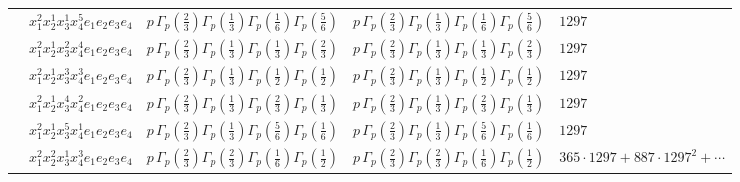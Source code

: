 \documentclass[11pt]{article}
\begin{document}
\begin{table}[ht]
{\begin{tabular}{@{}lllll@{}}
 & $x_{1}^{2} x_{2}^{1} x_{3}^{1} x_{4}^{5}  e_{1} e_{2} e_{3} e_{4}$ & $p \, \Gamma_p \left( \frac{2}{3} \right) \Gamma_p \left( \frac{1}{3} \right) \Gamma_p \left( \frac{1}{6} \right) \Gamma_p \left( \frac{5}{6} \right)$ & $p \, \Gamma_p \left( \frac{2}{3} \right) \Gamma_p \left( \frac{1}{3} \right) \Gamma_p \left( \frac{1}{6} \right) \Gamma_p \left( \frac{5}{6} \right)$ & $1297$ \\
 & $x_{1}^{2} x_{2}^{1} x_{3}^{2} x_{4}^{4}  e_{1} e_{2} e_{3} e_{4}$ & $p \, \Gamma_p \left( \frac{2}{3} \right) \Gamma_p \left( \frac{1}{3} \right) \Gamma_p \left( \frac{1}{3} \right) \Gamma_p \left( \frac{2}{3} \right)$ & $p \, \Gamma_p \left( \frac{2}{3} \right) \Gamma_p \left( \frac{1}{3} \right) \Gamma_p \left( \frac{1}{3} \right) \Gamma_p \left( \frac{2}{3} \right)$ & $1297$ \\
 & $x_{1}^{2} x_{2}^{1} x_{3}^{3} x_{4}^{3}  e_{1} e_{2} e_{3} e_{4}$ & $p \, \Gamma_p \left( \frac{2}{3} \right) \Gamma_p \left( \frac{1}{3} \right) \Gamma_p \left( \frac{1}{2} \right) \Gamma_p \left( \frac{1}{2} \right)$ & $p \, \Gamma_p \left( \frac{2}{3} \right) \Gamma_p \left( \frac{1}{3} \right) \Gamma_p \left( \frac{1}{2} \right) \Gamma_p \left( \frac{1}{2} \right)$ & $1297$ \\
 & $x_{1}^{2} x_{2}^{1} x_{3}^{4} x_{4}^{2}  e_{1} e_{2} e_{3} e_{4}$ & $p \, \Gamma_p \left( \frac{2}{3} \right) \Gamma_p \left( \frac{1}{3} \right) \Gamma_p \left( \frac{2}{3} \right) \Gamma_p \left( \frac{1}{3} \right)$ & $p \, \Gamma_p \left( \frac{2}{3} \right) \Gamma_p \left( \frac{1}{3} \right) \Gamma_p \left( \frac{2}{3} \right) \Gamma_p \left( \frac{1}{3} \right)$ & $1297$ \\
 & $x_{1}^{2} x_{2}^{1} x_{3}^{5} x_{4}^{1}  e_{1} e_{2} e_{3} e_{4}$ & $p \, \Gamma_p \left( \frac{2}{3} \right) \Gamma_p \left( \frac{1}{3} \right) \Gamma_p \left( \frac{5}{6} \right) \Gamma_p \left( \frac{1}{6} \right)$ & $p \, \Gamma_p \left( \frac{2}{3} \right) \Gamma_p \left( \frac{1}{3} \right) \Gamma_p \left( \frac{5}{6} \right) \Gamma_p \left( \frac{1}{6} \right)$ & $1297$ \\
 & $x_{1}^{2} x_{2}^{2} x_{3}^{1} x_{4}^{3}  e_{1} e_{2} e_{3} e_{4}$ & $p \, \Gamma_p \left( \frac{2}{3} \right) \Gamma_p \left( \frac{2}{3} \right) \Gamma_p \left( \frac{1}{6} \right) \Gamma_p \left( \frac{1}{2} \right)$ & $p \, \Gamma_p \left( \frac{2}{3} \right) \Gamma_p \left( \frac{2}{3} \right) \Gamma_p \left( \frac{1}{6} \right) \Gamma_p \left( \frac{1}{2} \right)$ & $365{\cdot}1297{+}887{\cdot}1297^{2}{+}\cdots$ \\

\end{tabular}}
\end{table}
\end{document}
